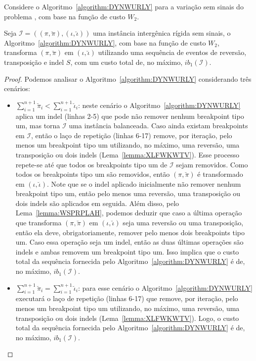 Considere o Algoritmo~\ref{algorithm:DYNWURLY} para a variação sem sinais do problema \SbWIRTI{}, com base na função de custo $W_2$.



\begin{lemma}\label{lemma:IKTEYDRR}
Seja $\mathcal{I} = ((\pi,\breve\pi),(\iota,\breve\iota))$ uma instância intergênica rígida sem sinais, o Algoritmo~\ref{algorithm:DYNWURLY}, com base na função de custo $W_2$, transforma $(\pi,\breve\pi)$ em $(\iota,\breve\iota)$ utilizando uma sequência de eventos de reversão, transposição e indel $S$, com um custo total de, no máximo, $ib_1(\mathcal{I})$.
\end{lemma}
\begin{proof}
  Podemos analisar o Algoritmo~\ref{algorithm:DYNWURLY} considerando três cenários:
  \begin{itemize}
    \item $\sum_{i=1}^{n+1}\breve\pi_i < \sum_{i=1}^{n+1}\breve\iota_i$: neste cenário o Algoritmo~\ref{algorithm:DYNWURLY} aplica um indel (linhas 2-5) que pode não remover nenhum breakpoint tipo um, mas torna $\mathcal{I}$ uma instância balanceada. Caso ainda existam breakpoints em $\mathcal{I}$, então o laço de repetição (linhas 6-17) remove, por iteração, pelo menos um breakpoint tipo um utilizando, no máximo, uma reversão, uma transposição ou dois indels (Lema~\ref{lemma:XLFWKWTV}). Esse processo repete-se até que todos os breakpoints tipo um de $\mathcal{I}$ sejam removidos. Como todos os breakpoints tipo um são removidos, então $(\pi,\breve\pi)$ é transformado em $(\iota,\breve\iota)$. Note que se o indel aplicado inicialmente não remover nenhum breakpoint tipo um, então pelo menos uma reversão, uma transposição ou dois indels são aplicados em seguida. Além disso, pelo Lema~\ref{lemma:WSPRPLAH}, podemos deduzir que caso a última operação que transforma $(\pi,\breve\pi)$ em $(\iota,\breve\iota)$ seja uma reversão ou uma transposição, então ela deve, obrigatoriamente, remover pelo menos dois breakpoints tipo um. Caso essa operação seja um indel, então as duas últimas operações são indels e ambas removem um breakpoint tipo um. Isso implica que o custo total da sequência fornecida pelo Algoritmo~\ref{algorithm:DYNWURLY} é de, no máximo, $ib_1(\mathcal{I})$.
    \item $\sum_{i=1}^{n+1}\breve\pi_i = \sum_{i=1}^{n+1}\breve\iota_i$: para esse cenário o Algoritmo~\ref{algorithm:DYNWURLY} executará o laço de repetição (linhas 6-17) que remove, por iteração, pelo menos um breakpoint tipo um utilizando, no máximo, uma reversão, uma transposição ou dois indels (Lema~\ref{lemma:XLFWKWTV}). Logo, o custo total da sequência fornecida pelo Algoritmo~\ref{algorithm:DYNWURLY} é de, no máximo, $ib_1(\mathcal{I})$.

\end{itemize}
\end{proof}

